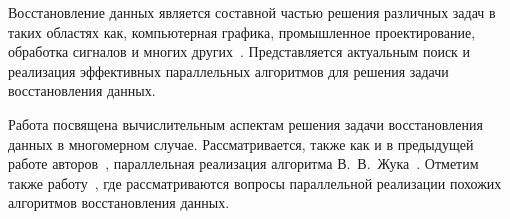 


Восстановление
данных является составной частью решения различных 
задач в таких областях как, компьютерная графика,
промышленное проектирование,
обработка сигналов и многих других~\cite{book_Kvasov, paper_recv_1, paper_recv_3}.
Представляется актуальным поиск и реализация эффективных параллельных алгоритмов
для решения задачи восстановления данных.

Работа посвящена 
вычислительным аспектам 
решения задачи восстановления данных в многомерном случае. 
Рассматривается, также как и в предыдущей работе авторов~\cite{my_paper_LETI_21},
параллельная реализация
алгоритма
В.~В.~Жука~\cite{book_Zhuk}. %
Отметим также работу~\cite{paper_Mas_recv},
где рассматриваются вопросы параллельной реализации
похожих алгоритмов восстановления данных.


